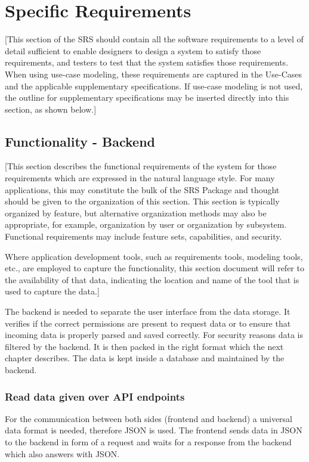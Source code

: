 \documentclass[a4paper,12pt,chapterprefix=false,bibliography=totoc,listof=totoc,]{scrreprt}
\begin{document}
\chapter{Specific Requirements}
{\color{blue} [This section of the SRS should contain all the software requirements to a level of detail sufficient to enable designers to design a system to satisfy those requirements, and testers to test that the system satisfies those requirements.   When using use-case modeling, these requirements are captured in the Use-Cases and the applicable supplementary specifications.  If use-case modeling is not used, the outline for supplementary specifications may be inserted directly into this section, as shown below.]}

\section{Functionality - Backend}
{\color{blue} [This section describes the functional requirements of the system for those requirements which are expressed in the natural language style. For many applications, this may constitute the bulk of the SRS Package and thought should be given to the organization of this section. This section is typically organized by feature, but alternative organization methods may also be appropriate, for example, organization by user or organization by subsystem.  Functional requirements may include feature sets, capabilities, and security.

Where application development tools, such as requirements tools, modeling tools, etc., are employed to capture the functionality, this section document will refer to the availability of that data, indicating the location and name of the tool that is used to capture the data.]}

{\color{magenta}
The backend is needed to separate the user interface from the data storage. It verifies if the correct permissions are present to request data or to ensure that incoming data is properly parsed and saved correctly. For security reasons data is filtered by the backend. It is then packed in the right format which the next chapter describes. The data is kept inside a database and maintained by the backend.
}


\subsection{{\color{magenta} Read data given over API endpoints}}
{\color{magenta}
For the communication between both sides (frontend and backend) a universal data format is needed, therefore JSON is used. The frontend sends data in JSON to the backend in form of a request and waits for a response from the backend which also answers with JSON.
}
\end{document}
